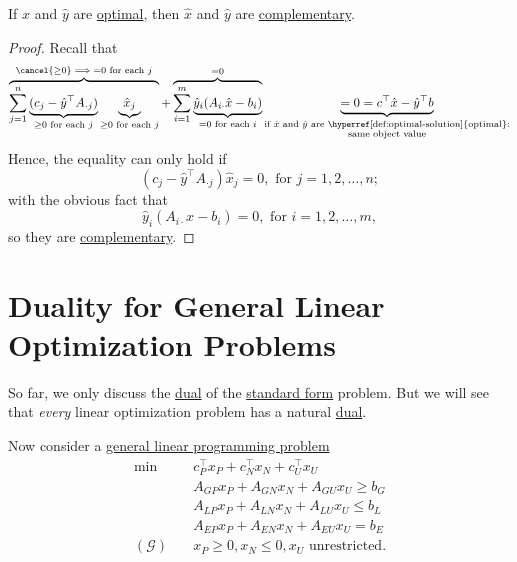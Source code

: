 \begin{theorem}\label{thm:strong-complementary-slackness-theorem}
	If \(\hat{x}\) and \(\hat{y}\) are \hyperref[def:optimal-solution]{optimal}, then \(\hat{x}\) and \(\hat{y}\) are \hyperref[def:complementary]{complementary}.
\end{theorem}
\begin{proof}
	Recall that
	\[
		\overbrace{\sum\limits_{j=1}^{n} \underbrace{(c_{j}-\hat{y}^{\top}A_{\cdot j})}_{ \geq 0\text{ for each }j}\underbrace{\hat{x}_{j}}_{\geq 0 \text{ for each }j}}^{\cancel{\geq 0}\implies = 0\text{ for each }j}
		+ \overbrace{\sum\limits_{i=1}^{m} \underbrace{\hat{y}_i(A_{i\cdot}\hat{x} - b_{i})}_{ = 0\text{ for each }i}}^{=0}
		\underbrace{= 0 = c^{\top}\hat{x} - \hat{y}^{\top}b}_{\substack{\text{if }\hat{x}\text{ and }\hat{y}\text{ are \hyperref[def:optimal-solution]{optimal}:}\\ \text{same object value}}}
	\]
	Hence, the equality can only hold if
	\[
		(c_{j} - \hat{y}^{\top}A_{\cdot j})\hat{x}_j = 0, \text{ for }j = 1, 2, \ldots , n;
	\]
	with the obvious fact that
	\[
		\hat{y}_i(A_{i\cdot}\hat{x} - b_{i}) = 0, \text{ for }i = 1, 2, \ldots , m,
	\]
	so they are \hyperref[def:complementary]{complementary}.
\end{proof}

\section{Duality for General Linear Optimization Problems}
So far, we only discuss the \hyperref[def:dual]{dual} of the \hyperref[def:standard-form]{standard form} problem. But we will see that \emph{every}
linear optimization problem has a natural \hyperref[def:dual]{dual}.

Now consider a \hyperref[def:general-linear-programming-problem]{general linear programming problem}
\[
	\begin{aligned}
		\min~              & c^{\top}_P x_P + c^{\top}_N x_N + c^{\top}_U x_U \\
		                   & A_{GP}x_P +A_{GN}x_N + A_{GU}x_U\geq b_G         \\
		                   & A_{LP}x_P +A_{LN}x_N + A_{LU}x_U \leq b_L        \\
		                   & A_{EP}x_P +A_{EN}x_N + A_{EU}x_U = b_E           \\
		(\mathcal{G})\quad & x_P\geq 0, x_N \leq 0, x_U \text{ unrestricted}.
	\end{aligned}
\]

